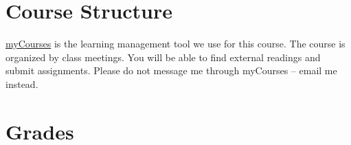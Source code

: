 \documentclass[
  letterpaper,
  DIV=11,
  numbers=noendperiod]{scrreprt}
\begin{document}
\hypertarget{course-structure}{%
\section*{Course Structure}\label{course-structure}}


\href{https://my.unh.edu/canvas}{myCourses} is the learning management
tool we use for this course. The course is organized by class meetings.
You will be able to find external readings and submit assignments.
Please do not message me through myCourses -- email me instead.

\hypertarget{grades}{%
\section*{Grades}\label{grades}}

\end{document}
